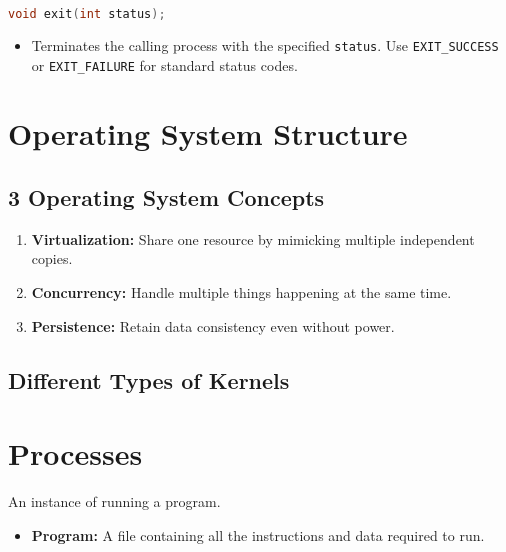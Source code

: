 \documentclass[twoside]{article}
\begin{document}
\begin{summary}
\begin{lstlisting}[language=C]
void exit(int status);
\end{lstlisting}
    \begin{itemize}
        \item Terminates the calling process with the specified \texttt{status}. Use \texttt{EXIT\_SUCCESS} or \texttt{EXIT\_FAILURE} for standard status codes.
    \end{itemize}
\end{summary}
\cleardoublepage

\section{Operating System Structure}

\subsection{3 Operating System Concepts}
\begin{definition}
    \begin{enumerate}
        \item \textbf{Virtualization:} Share one resource by mimicking multiple independent copies.
        \item \textbf{Concurrency:} Handle multiple things happening at the same time.
        \item \textbf{Persistence:} Retain data consistency even without power. 
    \end{enumerate}
\end{definition}

\subsection{Different Types of Kernels}

\section{Processes}
\begin{definition}
    An instance of running a program.
    \begin{itemize}
        \item \textbf{Program:} A file containing all the instructions and data required to run. 
    \end{itemize}
\end{definition}
\end{document}
